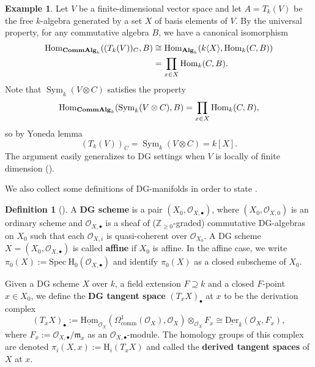 \documentclass{article}
\numberwithin{equation}{section} %
\theoremstyle{plain}
\theoremstyle{definition}
\newtheorem{definition}[theorem]{Definition}
\newtheorem{example}[theorem]{Example}
\theoremstyle{remark}
\begin{document}
\begin{example}\label{Example_FreeAlg}
Let $V$ be a finite-dimensional vector space and let $A=T_k(V)$ be the free $k$-algebra generated by a set $X$ of basis elements of $V$.
By the universal property, for any commutative algebra $B$, we have a canonical isomorphism
\begin{align*}
\operatorname{Hom}_{{\bf CommAlg}_k}((T_k(V))_C,B)&\cong\operatorname{Hom}_{{\bf Alg}_k}(k\langle X\rangle,\operatorname{Hom}_k(C,B))\\
&=\prod_{x\in X}\operatorname{Hom}_k(C,B).
\end{align*}
Note that $\operatorname{Sym}_k(V\otimes C)$ satisfies the property
\begin{equation*}
\operatorname{Hom}_{{\bf CommAlg}_k}(\operatorname{Sym}_k(V\otimes C),B)=\prod_{x\in X}\operatorname{Hom}_k(C,B),
\end{equation*}
so by Yoneda lemma
\begin{equation*}
(T_k(V))_C=\operatorname{Sym}_k(V\otimes C)=k[X].
\end{equation*}
The argument easily generalizes to DG settings when $V$ is locally of finite dimension ().
\end{example}

We also collect some definitions of DG-manifolds in order to state .

\begin{definition}[{\cite[Section 2.2 and Section 2.5]{CK01}}]
A \textbf{DG scheme} is a pair $(X_0,\mathcal{O}_{X,\bullet})$, where $(X_0,\mathcal{O}_{X,0})$ is an ordinary scheme and $\mathcal{O}_{X,\bullet}$ is a sheaf of ($\mathbb{Z}_{\geq0}$-graded) commutative DG-algebras on $X_0$ such that each $\mathcal{O}_{X,i}$ is quasi-coherent over $\mathcal{O}_{X_0}$.
A DG scheme $X=(X_0,\mathcal{O}_{X,\bullet})$ is called \textbf{affine} if $X_0$ is affine.
In the affine case, we write $\pi_0(X):=\mathrm{Spec}~\mathrm{H}_0(\mathcal{O}_{X,\bullet})$ and identify $\pi_0(X)$ as a closed subscheme of $X_0$.

Given a DG scheme $X$ over $k$, a field extension $F\supseteq k$ and a closed $F$-point $x\in X_0$, we define the \textbf{DG tangent space} $(T_xX)_\bullet$ at $x$ to be the derivation complex
\begin{equation*}
(T_xX)_\bullet:=\underline{\mathrm{Hom}}_{\mathcal{O}_X}(\Omega^1_{\mathrm{comm}}(\mathcal{O}_{X}),\mathcal{O}_X)\otimes_{\mathcal{O}_X}F_x\cong\underline{\mathrm{Der}}_k(\mathcal{O}_{X},F_x),
\end{equation*}
where $F_x:=\mathcal{O}_{X,\bullet}/\mathfrak{m}_x$ as an $\mathcal{O}_{X,\bullet}$-module.
The homology groups of this complex are denoted $\pi_i(X,x):=\mathrm{H}_i(T_xX)$ and called the \textbf{derived tangent spaces} of $X$ at $x$.
\end{definition}
\end{document}
